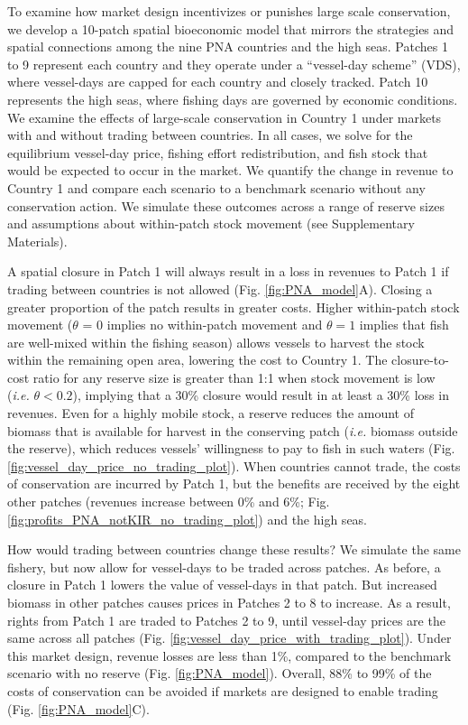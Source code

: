 \documentclass[12pt]{article}
\begin{document}
To examine how market design incentivizes or punishes large scale conservation, we develop a 10-patch spatial bioeconomic model that mirrors the strategies and spatial connections among the nine PNA countries and the high seas. Patches 1 to 9 represent each country and they operate under a ``vessel-day scheme'' (VDS), where vessel-days are capped for each country and closely tracked. Patch 10 represents the high seas, where fishing days are governed by economic conditions. We examine the effects of large-scale conservation in Country 1 under markets with and without trading between countries. In all cases, we solve for the equilibrium vessel-day price, fishing effort redistribution, and fish stock that would be expected to occur in the market. We quantify the change in revenue to Country 1 and compare each scenario to a benchmark scenario without any conservation action. We simulate these outcomes across a range of reserve sizes and assumptions about within-patch stock movement (see Supplementary Materials).

A spatial closure in Patch 1 will always result in a loss in revenues to Patch 1 if trading between countries is not allowed (Fig. \ref{fig:PNA_model}A). Closing a greater proportion of the patch results in greater costs. Higher within-patch stock movement ($\theta$ = 0 implies no within-patch movement and $\theta = 1$ implies that fish are well-mixed within the fishing season) allows vessels to harvest the stock within the remaining open area, lowering the cost to Country 1. The closure-to-cost ratio for any reserve size is greater than 1:1 when stock movement is low (\emph{i.e.} $\theta < 0.2$), implying that a 30\% closure would result in at least a 30\% loss in revenues. Even for a highly mobile stock, a reserve reduces the amount of biomass that is available for harvest in the conserving patch (\emph{i.e.} biomass outside the reserve), which reduces vessels' willingness to pay to fish in such waters (Fig. \ref{fig:vessel_day_price_no_trading_plot}). When countries cannot trade, the costs of conservation are incurred by Patch 1, but the benefits are received by the eight other patches (revenues increase between 0\% and 6\%; Fig. \ref{fig:profits_PNA_notKIR_no_trading_plot}) and the high seas.

How would trading between countries change these results? We simulate the same fishery, but now allow for vessel-days to be traded across patches. As before, a closure in Patch 1 lowers the value of vessel-days in that patch. But increased biomass in other patches causes prices in Patches 2 to 8 to increase. As a result, rights from Patch 1 are traded to Patches 2 to 9, until vessel-day prices are the same across all patches (Fig. \ref{fig:vessel_day_price_with_trading_plot}). Under this market design, revenue losses are less than 1\%, compared to the benchmark scenario with no reserve (Fig. \ref{fig:PNA_model}). Overall, 88\% to 99\% of the costs of conservation can be avoided if markets are designed to enable trading (Fig. \ref{fig:PNA_model}C).
\end{document}
